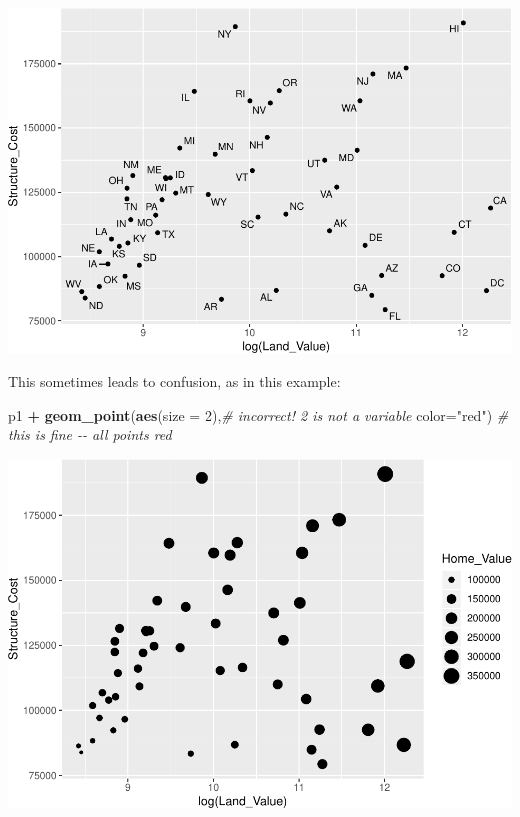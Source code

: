 \documentclass[
]{book}
\newenvironment{Shaded}{\begin{snugshade}}{\end{snugshade}}
\newcommand{\CommentTok}[1]{\textcolor[rgb]{0.56,0.35,0.01}{\textit{#1}}}
\newcommand{\DataTypeTok}[1]{\textcolor[rgb]{0.13,0.29,0.53}{#1}}
\newcommand{\DecValTok}[1]{\textcolor[rgb]{0.00,0.00,0.81}{#1}}
\newcommand{\KeywordTok}[1]{\textcolor[rgb]{0.13,0.29,0.53}{\textbf{#1}}}
\newcommand{\NormalTok}[1]{#1}
\newcommand{\OperatorTok}[1]{\textcolor[rgb]{0.81,0.36,0.00}{\textbf{#1}}}
\newcommand{\StringTok}[1]{\textcolor[rgb]{0.31,0.60,0.02}{#1}}
\begin{document}
\includegraphics{R/Rgraphics/figures/unnamed-chunk-151-1.pdf}

This sometimes leads to confusion, as in this example:

\begin{Shaded}
\begin{Highlighting}[]
\NormalTok{p1 }\OperatorTok{+}
\StringTok{  }\KeywordTok{geom\_point}\NormalTok{(}\KeywordTok{aes}\NormalTok{(}\DataTypeTok{size =} \DecValTok{2}\NormalTok{),}\CommentTok{\# incorrect! 2 is not a variable}
             \DataTypeTok{color=}\StringTok{"red"}\NormalTok{) }\CommentTok{\# this is fine {-}{-} all points red}
\end{Highlighting}
\end{Shaded}

\includegraphics{R/Rgraphics/figures/unnamed-chunk-152-1.pdf}
\end{document}
